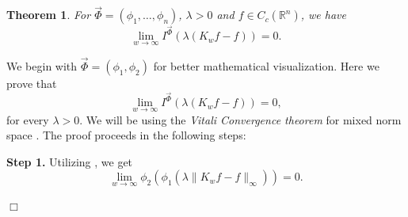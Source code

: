 \documentclass[11pt, a4paper]{article}
\newtheorem{thm}{Theorem}[section]
\theoremstyle{definition}
\newcommand{\qedwhite}{\hfill \ensuremath{\Box}}
\renewenvironment{proof}{{\raggedright \bfseries Proof.}}{\qedwhite}
\numberwithin{equation}{section}
\def\RR{\mathbb R}
\begin{document}
\begin{thm}\label{thm 5.2}
    For $\overrightarrow{\Phi}=(\phi_1,\dots,\phi_n)$, $\lambda>0$ and $f\in C_{c}(\RR^{n})$, we have
    \begin{equation*}  
    	\lim_{w\to\infty}I^{ \overrightarrow{\Phi}}(\lambda (K_wf-f))=0.
    \end{equation*}
\end{thm}
\begin{proof}
	 We begin with $\overrightarrow{\Phi}=(\phi_1,\phi_2)$ for better mathematical visualization. Here we prove that
     \begin{equation*}
     	\lim_{w\to\infty}I^{\overrightarrow{\Phi}}(\lambda(K_{w}f-f))
     	=0,
     	\end{equation*}
    for every $\lambda>0.$ 
We will be using the \emph{Vitali Convergence theorem} for mixed norm space \cite{vitali}. The proof proceeds in the following steps:\par 

\textbf{Step 1.} Utilizing \cite[Theorem 4.1]{multi}, we get $$\lim_{w\to\infty}\phi_2(\phi_1(\lambda\|K_wf-f\|_{\infty}))=0.$$


\end{proof}
\end{document}
